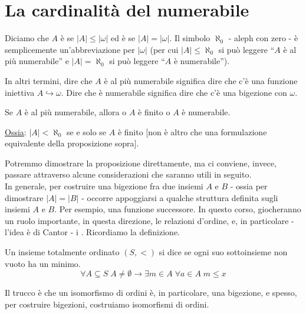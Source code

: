 \documentclass[11pt]{scrartcl}
\begin{document}
\newpage
\section{La cardinalità del numerabile}

\begin{definition}[Numerabilità]
	Diciamo che $A$ è  se $|A| \leq |\omega|$ ed è  se $|A| = |\omega|$.
	Il simbolo $\aleph_0$ - aleph con zero - è semplicemente un'abbreviazione per $|\omega|$ (per cui $|A| \leq \aleph_0$ si può leggere ``$A$ è al più numerabile'' e $|A| = \aleph_0$ si 
	può leggere ``$A$ è numerabile'').
\end{definition}

\begin{remark}
	In altri termini, dire che $A$ è al più numerabile significa dire che c'è una funzione iniettiva $A \hookrightarrow \omega$. Dire che è numerabile significa dire che c'è una bigezione con $\omega$.
\end{remark}

\begin{proposition}
	Se $A$ è al più numerabile, allora o $A$ è finito o $A$ è numerabile.
\end{proposition}

\underline{Ossia}: $|A| < \aleph_0$ se e solo se $A$ è finito [non è altro che una formulazione equivalente della proposizione sopra].

Potremmo dimostrare la proposizione direttamente, ma ci conviene, invece, passare attraverso alcune considerazioni che saranno utili in seguito.\\
In generale, per costruire una bigezione fra due insiemi $A$ e $B$ - ossia per dimostrare $|A| = |B|$ - occorre appoggiarsi a qualche struttura definita sugli insiemi $A$
e $B$. Per esempio, una funzione successore. In questo corso, giocheranno un ruolo importante, in questa direzione, le relazioni d'ordine, e, in particolare - l'idea è di Cantor - i 
. Ricordiamo la definizione.

\begin{definition}
	Un insieme totalmente ordinato $(S,<)$ si dice  se ogni suo sottoinsieme non vuoto ha un minimo.
	\[ \forall A \subseteq S \; A \ne \emptyset \longrightarrow \exists m \in A \; \forall a \in A \; m \leq x
		\]
\end{definition}

Il trucco è che un isomorfismo di ordini è, in particolare, una bigezione, e spesso, per costruire bigezioni, costruiamo isomorfismi di ordini.
\end{document}
